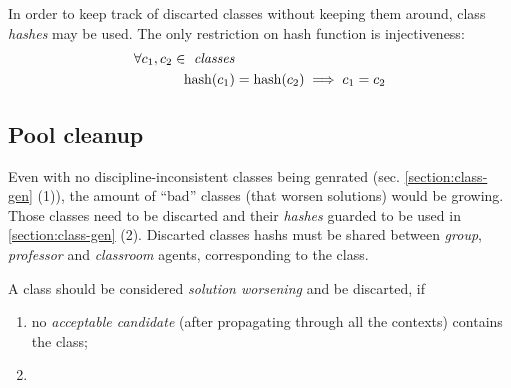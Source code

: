 In order to keep track of discarted classes without keeping them around,
class \emph{hashes} may be used. The only restriction on hash function is
injectiveness:
\begin{align*}
  \forall c_1, c_2 \in \text{ \emph{classes}} & \\
  \mathrm{hash}(c_1) &= \mathrm{hash}(c_2) \implies c_1 = c_2
\end{align*}

\subsection{Pool cleanup}
\label{section:clean-pool}

Even with no discipline-inconsistent classes being genrated
(sec. \ref{section:class-gen} (1)), the amount of
``bad'' classes (that worsen solutions) would be growing.
Those classes need to be discarted and their \emph{hashes} guarded
to be used in \ref{section:class-gen} (2). Discarted classes hashs must be
shared between \emph{group}, \emph{professor} and \emph{classroom} agents,
corresponding to the class.

A class should be considered \emph{solution worsening} and be discarted, if
\begin{enumerate}
  \item no \emph{acceptable candidate} (after propagating through all the contexts)
    contains the class;
  \item {}
\end{enumerate}


